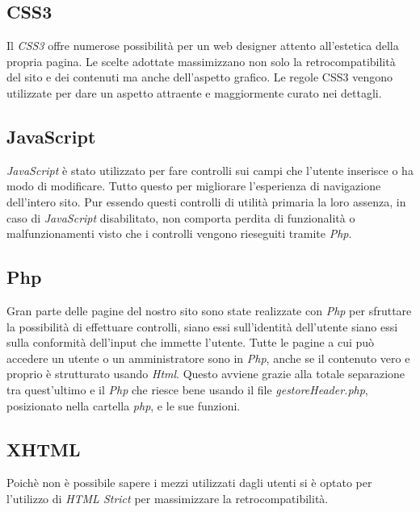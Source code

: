 \documentclass[12pt]{article}
\begin{document}
\subsection{CSS3}
Il \textit{CSS3} offre numerose possibilità per un web designer attento all'estetica della propria pagina. Le scelte adottate massimizzano non solo la retrocompatibilità del sito e dei contenuti ma anche dell'aspetto grafico. Le regole CSS3 vengono utilizzate per dare un aspetto attraente e maggiormente curato nei dettagli.

\subsection{JavaScript}
\textit{JavaScript} è stato utilizzato per fare controlli sui campi che l'utente inserisce o ha modo di modificare. Tutto questo per migliorare l'esperienza di navigazione dell'intero sito. Pur essendo questi controlli di utilità primaria la loro assenza, in caso di \textit{JavaScript} disabilitato, non comporta perdita di funzionalità o malfunzionamenti visto che i controlli  vengono rieseguiti tramite \textit{Php}.

\subsection{Php}
Gran parte delle pagine del nostro sito sono state realizzate con \textit{Php} per sfruttare la possibilità di effettuare controlli, siano essi sull'identità dell'utente siano essi sulla conformità dell'input che immette l'utente. Tutte le pagine a cui può accedere un utente o un amministratore sono in \textit{Php}, anche se il contenuto vero e proprio è strutturato usando \textit{Html}. Questo avviene grazie alla totale separazione tra quest'ultimo e il \textit{Php} che riesce bene usando il file \textit{gestoreHeader.php}, posizionato nella cartella \textit{php}, e le sue funzioni.

\subsection{XHTML}
Poichè non è possibile sapere i mezzi utilizzati dagli utenti si è optato per l'utilizzo di \textit{HTML Strict} per massimizzare la retrocompatibilità.

\newpage
\end{document}
